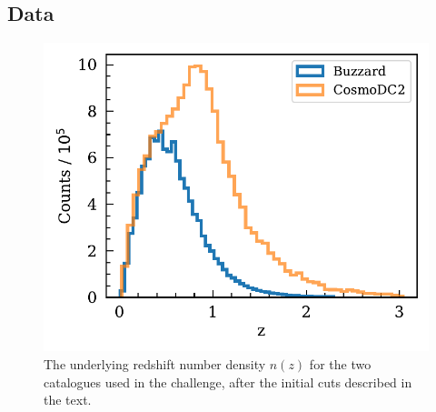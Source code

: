 \documentclass[twocolumn,twocolappendix]{aastex63}
\begin{document}
\subsection{Data}
\label{sec:data}

\begin{figure}[htbp]
	\includegraphics[width=0.9\linewidth]{results/initial_data.pdf}
	\caption{The underlying redshift number density $n(z)$ for the two catalogues used in the challenge,
		after the initial cuts described in the text.}
	\label{fig:initial_nz}
\end{figure}
\end{document}
